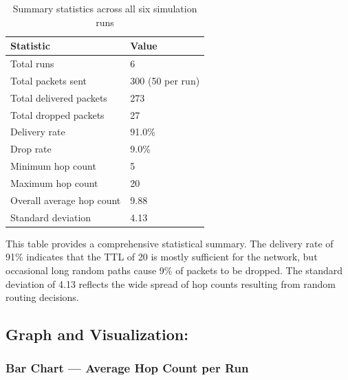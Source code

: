 \documentclass[12pt,a4paper]{article}
\begin{document}
\begin{table}[H]
\centering
\renewcommand{\arraystretch}{1.5}
\begin{tabular}{@{}ll@{}}
\toprule
\textbf{Statistic}        & \textbf{Value} \\
\midrule
Total runs                & 6 \\
Total packets sent        & 300 (50 per run) \\
Total delivered packets   & 273 \\
Total dropped packets     & 27 \\
Delivery rate             & 91.0\% \\
Drop rate                 & 9.0\% \\
Minimum hop count         & 5 \\
Maximum hop count         & 20 \\
Overall average hop count & 9.88 \\
Standard deviation        & 4.13 \\
\bottomrule
\end{tabular}
\caption{Summary statistics across all six simulation runs}
\end{table}

\justifying
This table provides a comprehensive statistical summary. The delivery rate of 91\% indicates that the TTL of 20 is mostly sufficient for the network, but occasional long random paths cause 9\% of packets to be dropped. The standard deviation of 4.13 reflects the wide spread of hop counts resulting from random routing decisions.

\subsection{Graph and Visualization: }

\subsubsection{Bar Chart --- Average Hop Count per Run}
\end{document}
